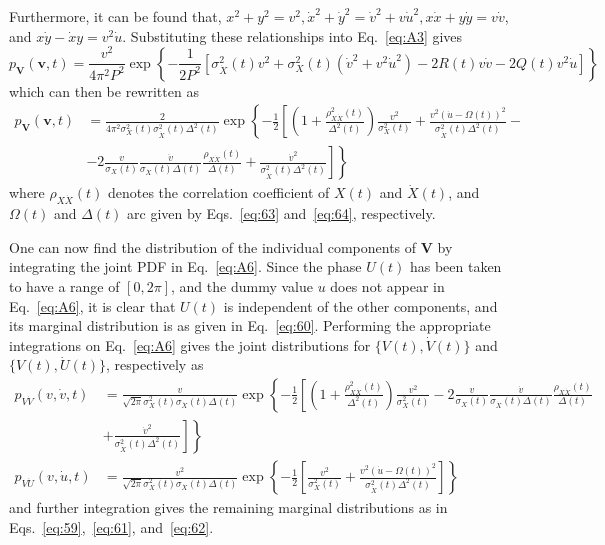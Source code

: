 \documentclass[12pt]{article}
\begin{document}
Furthermore, it can be found that, $x^{2}+y^{2}=v^{2}, \dot{x}^{2}+\dot{y}^{2}=\dot{v}^{2}+v \dot{u}^{2}, x \dot{x}+y \dot{y}=v \dot{v}$, and $x \dot{y}-\dot{x} y=v^{2} \dot{u}$. Substituting these relationships into Eq.~\eqref{eq:A3} gives
\begin{equation}
p_{\mathbf{V}}(\mathbf{v}, t)=\frac{v^{2}}{4 \pi^{2} P^{2}} \exp \left\{-\frac{1}{2 P^{2}}\left[\sigma_{\dot{X}}^{2}(t) v^{2}+\sigma_{X}^{2}(t)\left(\dot{v}^{2}+v^{2} \dot{u}^{2}\right)-2 R(t) v \dot{v}-2 Q(t) v^{2} \dot{u}\right]\right\}
\label{eq:A5}
\end{equation}
which can then be rewritten as
\begin{align}
p_{\mathbf{V}}(\mathbf{v}, t) &=\frac{2}{4 \pi^{2} \sigma_{X}^{2}(t) \sigma_{\dot{X}}^{2}(t) \Delta^{2}(t)} \exp \left\{-\frac{1}{2}\left[\left(1+\frac{\rho_{X \dot{X}}^{2}(t)}{\Delta^{2}(t)}\right) \frac{v^{2}}{\sigma_{X}^{2}(t)}+\frac{v^{2}(\dot{u}-\Omega(t))^{2}}{\sigma_{\dot{X}}^{2}(t) \Delta^{2}(t)}-\right.\right. \nonumber \\
&\left.\left.-2 \frac{v}{\sigma_{X}(t)} \frac{\dot{v}}{\sigma_{\dot{X}}(t) \Delta(t)} \frac{\rho_{X \dot{X}}(t)}{\Delta(t)}+\frac{\dot{v}^{2}}{\sigma_{\dot{X}}^{2}(t) \Delta^{2}(t)}\right]\right\}
\label{eq:A6}
\end{align}
where $\rho_{X \dot{X}}(t)$ denotes the correlation coefficient of $X(t)$ and $\dot{X}(t)$, and $\Omega(t)$ and $\Delta(t)$ arc given by Eqs.~\eqref{eq:63} and~\eqref{eq:64}, respectively.

One can now find the distribution of the individual components of $\mathbf{V}$ by integrating the joint PDF in Eq.~\eqref{eq:A6}. Since the phase $U(t)$ has been taken to have a range of $[0,2 \pi]$, and the dummy value $u$ does not appear in Eq.~\eqref{eq:A6}, it is clear that $U(t)$ is independent of the other components, and its marginal distribution is as given in Eq.~\eqref{eq:60}. Performing the appropriate integrations on Eq.~\eqref{eq:A6} gives the joint distributions for $\{V(t), \dot{V}(t)\}$ and $\{V(t), \dot{U}(t)\}$, respectively as
\begin{align}
p_{V \dot{V}}(v, \dot{v}, t) &=\frac{v}{\sqrt{2 \pi} \sigma_{X}^{2}(t) \sigma_{\dot{X}}(t) \Delta(t)} \exp \left\{-\frac{1}{2}\left[\left(1+\frac{\rho_{X \dot{X}}^{2}(t)}{\Delta^{2}(t)}\right) \frac{v^{2}}{\sigma_{X}^{2}(t)}-2 \frac{v}{\sigma_{X}(t)} \frac{\dot{v}}{\sigma_{\dot{X}}(t) \Delta(t)} \frac{\rho_{X \dot{X}}(t)}{\Delta(t)}\right.\right. \nonumber \\
&\left.\left.+\frac{\dot{v}^{2}}{\sigma_{\dot{X}}^{2}(t) \Delta^{2}(t)}\right]\right\} \label{eq:A7} \\
p_{V \dot{U}}(v, \dot{u}, t) &=\frac{v^{2}}{\sqrt{2 \pi} \sigma_{X}^{2}(t) \sigma_{\dot{X}}(t) \Delta(t)} \exp \left\{-\frac{1}{2}\left[\frac{v^{2}}{\sigma_{X}^{2}(t)}+\frac{v^{2}(\dot{u}-\Omega(t))^{2}}{\sigma_{\dot{X}}^{2}(t) \Delta^{2}(t)}\right]\right\}
\label{eq:A8}
\end{align}
and further integration gives the remaining marginal distributions as in Eqs.~\eqref{eq:59},~\eqref{eq:61}, and~\eqref{eq:62}.
\end{document}
